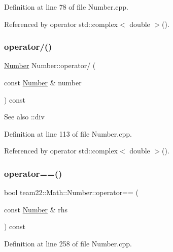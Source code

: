 Definition at line 78 of file Number.\+cpp.



Referenced by operator std\+::complex$<$ double $>$().

\mbox{\label{classteam22_1_1_math_1_1_number_aa34d5ef75101e4b65f7840a1df0e8572}} 
\subsubsection{\texorpdfstring{operator/()}{operator/()}}
{\footnotesize\ttfamily \hyperlink{classteam22_1_1_math_1_1_number}{Number} Number\+::operator/ (\begin{DoxyParamCaption}\item[{const \hyperlink{classteam22_1_1_math_1_1_number}{Number} \&}]{number }\end{DoxyParamCaption}) const}

\begin{DoxySeeAlso}{See also}
\+::div 
\end{DoxySeeAlso}


Definition at line 113 of file Number.\+cpp.



Referenced by operator std\+::complex$<$ double $>$().

\mbox{\label{classteam22_1_1_math_1_1_number_a91aafaa2aa878c94155e364488c56e63}} 
\subsubsection{\texorpdfstring{operator==()}{operator==()}}
{\footnotesize\ttfamily bool team22\+::\+Math\+::\+Number\+::operator== (\begin{DoxyParamCaption}\item[{const \hyperlink{classteam22_1_1_math_1_1_number}{Number} \&}]{rhs }\end{DoxyParamCaption}) const}



Definition at line 258 of file Number.\+cpp.



